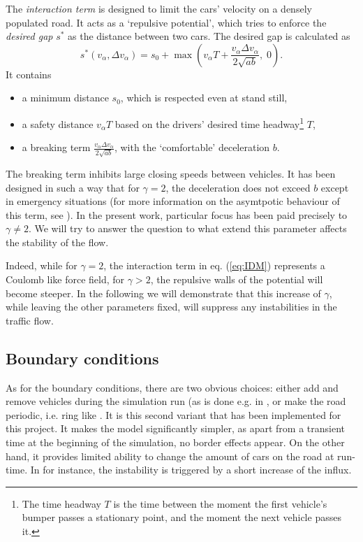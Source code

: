 The \emph{interaction term} is designed to limit the cars' velocity on a densely populated road. It acts as a `repulsive potential', which tries to enforce the \emph{desired gap} $s^*$ as the distance between two cars. The desired gap is calculated as
\begin{equation}
s^*(v_\alpha, \Delta v_\alpha) = s_0 + \max\left(v_\alpha T + \frac{v_\alpha \Delta v_\alpha}{2\sqrt{ab}},\;0\right).
\label{eq:desired_gap}
\end{equation}
It contains
\begin{itemize}
    \item a minimum distance $s_0$, which is respected even at stand still,
    \item a safety distance $v_\alpha T$ based on the drivers' desired time headway\footnote{The time headway $T$ is the time between the moment the first vehicle's bumper passes a stationary point, and the moment the next vehicle passes it.} $T$,
    \item a breaking term $\frac{v_\alpha \Delta v_\alpha}{2\sqrt{ab}}$, with the `comfortable' deceleration $b$.
\end{itemize}
The breaking term inhibits large closing speeds between vehicles. It has been designed in such a way that for $\gamma = 2$, the deceleration does not exceed $b$ except in emergency situations (for more information on the asymtpotic behaviour of this term, see \cite{treiber2000}). In the present work, particular focus has been paid precisely to  $\gamma \ne 2$. We will try to answer the question to what extend this parameter affects the stability of the flow.

Indeed, while for $\gamma=2$, the interaction term in eq. (\ref{eq:IDM}) represents a Coulomb like force field, for $\gamma>2$, the repulsive walls of the potential will become steeper. In the following we will demonstrate that this increase of $\gamma$, while leaving the other parameters fixed, will suppress any instabilities in the traffic flow.

\subsection{Boundary conditions}
As for the boundary conditions, there are two obvious choices: either add and remove vehicles during the simulation run (as is done e.g. in \cite{treiber1999}, or make the road periodic, i.e. ring like \cite{treiber2015}. It is this second variant that has been implemented for this project. It makes the model significantly simpler, as apart from a transient time at the beginning of the simulation, no border effects appear. On the other hand, it provides limited ability to change the amount of cars on the road at run-time. In \cite{treiber1999, treiber2006} for instance, the instability is triggered by a short increase of the influx.

